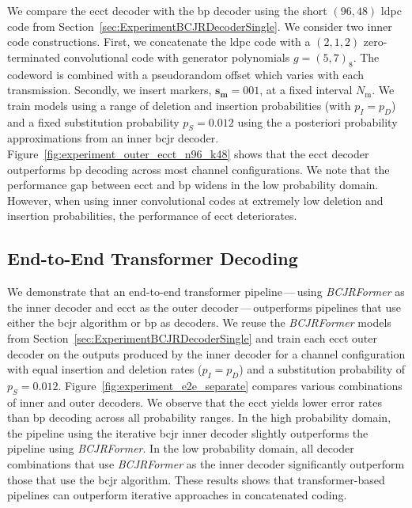 \documentclass[conference,letterpaperu]{IEEEtran}
\newcommand{\pdel}{\ensuremath{p_D}}
\newcommand{\pins}{\ensuremath{p_I}}
\newcommand{\psub}{\ensuremath{p_S}}
\newcommand{\marker}{\ensuremath{\bm{s_{\text{m}}}}}
\newcommand{\markerFreq}{\ensuremath{N_{\text{m}}}}
\begin{document}
\label{sec:ExperimentECCTOuterDecoding}
We compare the \ac{ecct} decoder with the \ac{bp} decoder using the short \((96, 48)\) \ac{ldpc} code from Section~\ref{sec:ExperimentBCJRDecoderSingle}. We consider two inner code constructions. First, we concatenate the \ac{ldpc} code with a $(2, 1, 2)$ zero-terminated convolutional code with generator polynomials \(g = (5, 7)_8\). The codeword is combined with a pseudorandom offset which varies with each transmission. Secondly, we insert markers, $\marker = 001$, at a fixed interval $\markerFreq$. We train models using a range of deletion and insertion probabilities (with \(\pins = \pdel\)) and a fixed substitution probability $\psub = 0.012$ using the a posteriori probability approximations from an inner \ac{bcjr} decoder. Figure~\ref{fig:experiment_outer_ecct_n96_k48} shows that the \ac{ecct} decoder outperforms \ac{bp} decoding across most channel configurations. We note that the performance gap between \ac{ecct} and \ac{bp} widens in the low probability domain. However, when using inner convolutional codes at extremely low deletion and insertion probabilities, the performance of \ac{ecct} deteriorates.


\subsection{End-to-End Transformer Decoding}

We demonstrate that an end-to-end transformer pipeline\,---\,using \textit{BCJRFormer} as the inner decoder and \ac{ecct} as the outer decoder\,---\,outperforms pipelines that use either the \ac{bcjr} algorithm or \ac{bp} as decoders. We reuse the \textit{BCJRFormer} models from Section~\ref{sec:ExperimentBCJRDecoderSingle} and train each \ac{ecct} outer decoder on the outputs produced by the inner decoder for a channel configuration with equal insertion and deletion rates ($\pins = \pdel$) and a substitution probability of $\psub = 0.012$. Figure~\ref{fig:experiment_e2e_separate} compares various combinations of inner and outer decoders. We observe that the \ac{ecct} yields lower error rates than \ac{bp} decoding across all probability ranges. In the high probability domain, the pipeline using the iterative \ac{bcjr} inner decoder slightly outperforms the pipeline using \textit{BCJRFormer}. In the low probability domain, all decoder combinations that use \textit{BCJRFormer} as the inner decoder significantly outperform those that use the \ac{bcjr} algorithm. These results shows that transformer-based pipelines can outperform iterative approaches in concatenated coding.
\end{document}
